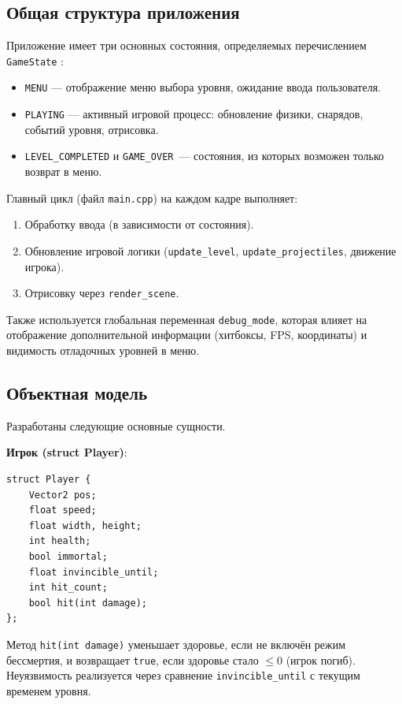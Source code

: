 \documentclass[../main.tex]{subfiles}
\begin{document}
\subsection{Общая структура приложения}

Приложение имеет три основных состояния, определяемых перечислением \texttt{GameState} \cite{gregory2026}:
\begin{itemize}
	\item \texttt{MENU} — отображение меню выбора уровня, ожидание ввода пользователя.
	\item \texttt{PLAYING} — активный игровой процесс: обновление физики, снарядов, событий уровня, отрисовка.
	\item \texttt{LEVEL\_COMPLETED} и \texttt{GAME\_OVER}~— состояния, из которых возможен только возврат в меню.
\end{itemize}

Главный цикл (файл \texttt{main.cpp}) на каждом кадре выполняет:
\begin{enumerate}
	\item Обработку ввода (в зависимости от состояния).
	\item Обновление игровой логики (\texttt{update\_level}, \texttt{update\_projectiles}, движение игрока).
	\item Отрисовку через \texttt{render\_scene}.
\end{enumerate}

Также используется глобальная переменная \texttt{debug\_mode}, которая влияет на отображение дополнительной информации (хитбоксы, FPS, координаты) и видимость отладочных уровней в меню.

\subsection{Объектная модель}

Разработаны следующие основные сущности.

\textbf{Игрок (struct Player)}:
\begin{lstlisting}[caption={Структура Player из game.h}]
struct Player {
	Vector2 pos;
	float speed;
	float width, height;
	int health;
	bool immortal;
	float invincible_until;
	int hit_count;
	bool hit(int damage);
};
\end{lstlisting}

Метод \texttt{hit(int damage)} уменьшает здоровье, если не включён режим бессмертия, и возвращает \texttt{true}, если здоровье стало $\le 0$ (игрок погиб). Неуязвимость реализуется через сравнение \texttt{invincible\_until} с текущим временем уровня.
\end{document}

